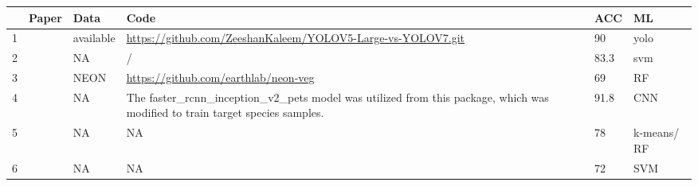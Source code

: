 \documentclass[9pt,lineno]{elife}
\begin{document}
\begin{table}[]
\begin{fullwidth}
\begin{tabular}{p{1cm}p{4cm}p{4cm}p{4cm}p{1cm}p{2cm}}
& \textbf{Paper}  & \textbf{Data}  & \textbf{Code}   & \textbf{ACC}   & \textbf{ML}   \\
\hline
1  & \cite{Khan_Dil_Misbah_Orakzai_Alam_Kaleem_2023}    & available  & \url{https://github.com/ZeeshanKaleem/YOLOV5-Large-vs-YOLOV7.git}       & 90               & yolo                \\
2  & \cite{Kuzmin_2021}                                                                                                                  & NA                                                                            & /                                                                                                                               & 83.3             & svm                 \\
3  & \cite{Scholl_Cattau_Joseph_Balch_2020}                                                                                                                 & NEON                  & \url{https://github.com/earthlab/neon-veg}                                                                                            & 69               & RF                  \\
4  & \cite{Moura_deOliveira_Sanquetta_Bastos_Mohan_Corte_2021}                                                                                                                  & NA                                                                            & The faster\_rcnn\_inception\_v2\_pets model was utilized from this package, which was modified to train target species samples. & 91.8             & CNN                 \\
5  & \cite{decid}                                                                                      & NA                                                                            & NA                                                                                                                              & 78               & k-means/ RF         \\
6  & \cite{Sothe_Dalponte_Almeida_Schimalski_Lima_Liesenberg_Miyoshi_Tommaselli_2019}                                                                                                                 & NA                                                                            & NA                                                                                                                              & 72               & SVM                 \\

\end{tabular}
\end{fullwidth}
\end{table}
\end{document}
